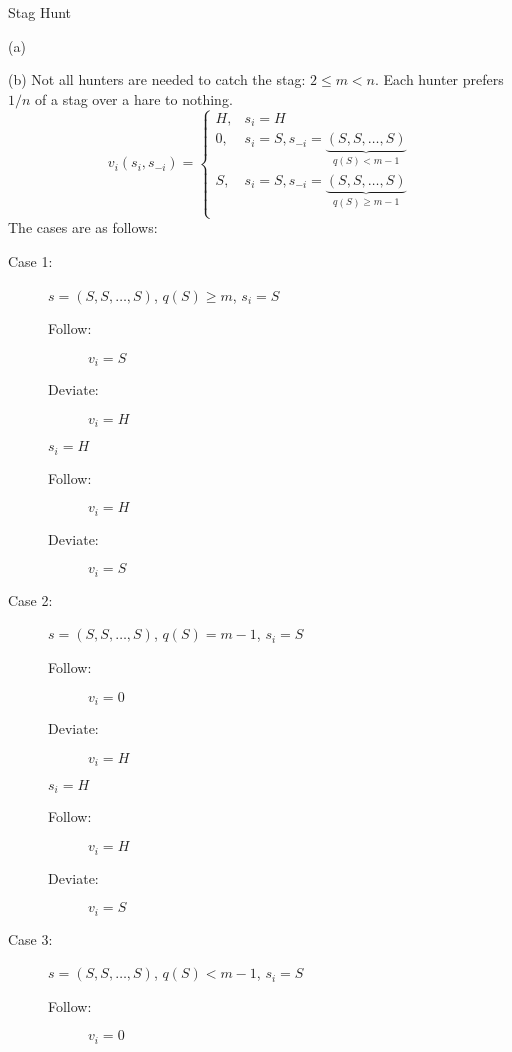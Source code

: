 \documentclass[10pt]{extarticle}
\begin{document}
\begin{problem}{Stag Hunt}
\begin{problem}{(a)}
    \end{problem}
    \begin{problem}{(b)}
      Not all hunters are needed to catch the stag: $2\leq m < n$. Each hunter prefers $1/n$ of a stag over a hare to nothing.
      \tcblower
      \[
        v_i(s_i,s_{-i}) = \begin{cases}
          H, & s_i = H\\
          0, & s_i = S,s_{-i} = \underbrace{(S,S,\dots,S)}_{q(S) < m-1}\\
          S, & s_i = S,s_{-i} = \underbrace{(S,S,\dots,S)}_{q(S) \geq m-1}\\
        \end{cases}
      \] 
      The cases are as follows:
      \begin{multicols}{2}
        \begin{description}
          \item[Case 1:] $s = (S,S,\dots,S)$, $q(S) \geq m$, $s_i=S$
            \begin{description}
              \item[Follow:] $v_i = S$
              \item[Deviate:] $v_i = H$
            \end{description}
            $s_i = H$
            \begin{description}
              \item[Follow:] $v_i = H$
              \item[Deviate:] $v_i = S$
            \end{description}
          \item[Case 2:] $s = (S,S,\dots,S)$, $q(S) = m-1$, $s_i = S$
            \begin{description}
              \item[Follow:] $v_i = 0$
              \item[Deviate:] $v_i = H$
            \end{description}
            $s_i = H$
            \begin{description}
              \item[Follow:] $v_i = H$
              \item[Deviate:] $v_i = S$
            \end{description}
          \item[Case 3:] $s = (S,S,\dots,S)$, $q(S) < m-1$, $s_i = S$
            \begin{description}
              \item[Follow:] $v_i = 0$

\end{description}
\end{description}
\end{multicols}
\end{problem}
\end{problem}
\end{document}
